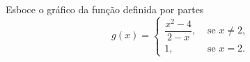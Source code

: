 \begin{example}
  Esboce o gráfico da função definida por partes
  \[
    g(x) = \begin{cases}
      \dfrac{x^2-4}{2-x}, & \text{ se } x \neq 2, \\
      1,                  & \text{ se } x =    2.
    \end{cases}
  \]

  \solution
\end{example}
